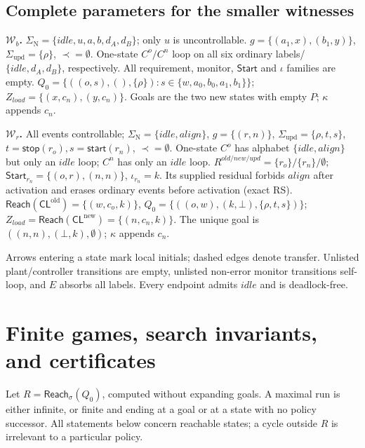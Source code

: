 \documentclass[11pt]{article}
\newcommand{\Reach}{\mathsf{Reach}}
\newcommand{\SigmaU}{\Sigma_{\mathrm{upd}}}
\newcommand{\ustart}[1]{\mathsf{start}(#1)}
\newcommand{\ustop}[1]{\mathsf{stop}(#1)}
\begin{document}
\subsection{Complete parameters for the smaller witnesses}
\textbf{$\mathcal W_b$.} $\Sigma_{\mathrm{N}}=\{idle,u,a,b,d_A,d_B\}$; only $u$ is uncontrollable.
$g=\{(a_1,x),(b_1,y)\}$, $\SigmaU=\{\rho\}$, $\prec=\emptyset$.
One-state $C^o/C^n$ loop on all six ordinary labels/$\{idle,d_A,d_B\}$, respectively.
All requirement, monitor, $\mathsf{Start}$ and $\iota$ families are empty.
$Q_0=\{((o,s),(),\{\rho\}):s\in\{w,a_0,b_0,a_1,b_1\}\}$;
$Z_{load}=\{(x,c_n),(y,c_n)\}$. Goals are the two new states with empty $P$; $\kappa$ appends $c_n$.
\par\textbf{$\mathcal W_r$.} All events controllable; $\Sigma_{\mathrm{N}}=\{idle,align\}$, $g=\{(r,n)\}$,
$\SigmaU=\{\rho,t,s\}$, $t=\ustop{r_o},s=\ustart{r_n}$, $\prec=\emptyset$.
One-state $C^o$ has alphabet $\{idle,align\}$ but only an $idle$ loop; $C^n$ has only an $idle$ loop.
$R^{old/new/upd}=\{r_o\}/\{r_n\}/\emptyset$;
$\mathsf{Start}_{r_n}=\{(o,r),(n,n)\}$, $\iota_{r_n}=k$. Its supplied residual forbids $align$ after activation and erases ordinary events before activation (exact RS).
$\Reach(\mathsf{CL}^{\mathrm{old}})=\{(w,c_o,k)\}$,
$Q_0=\{((o,w),(k,\bot),\{\rho,t,s\})\}$;
$Z_{load}=\Reach(\mathsf{CL}^{\mathrm{new}})=\{(n,c_n,k)\}$. The unique goal is $((n,n),(\bot,k),\emptyset)$; $\kappa$ appends $c_n$.
\par Arrows entering a state mark local initials; dashed edges denote transfer. Unlisted plant/controller transitions are empty, unlisted non-error monitor transitions self-loop, and $E$ absorbs all labels. Every endpoint admits $idle$ and is deadlock-free.

\section{Finite games, search invariants, and certificates}
\label{supp:search}
Let $R=\Reach_\sigma(Q_0)$, computed without expanding goals. A maximal run is either infinite, or finite and ending at a goal or at a state with no policy successor. All statements below concern reachable states; a cycle outside $R$ is irrelevant to a particular policy.
\end{document}
